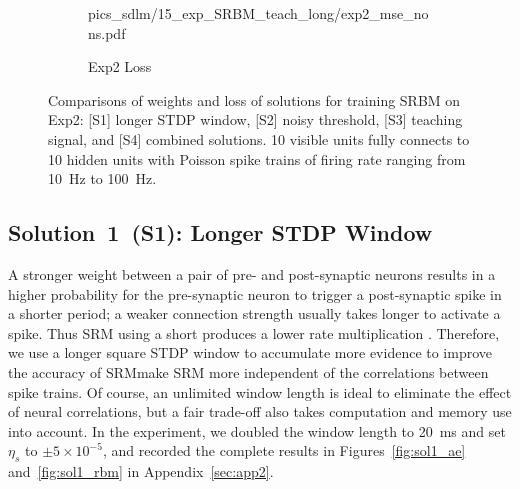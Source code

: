 \begin{figure}
\begin{subfigure}[c]{0.48\textwidth}
{			{pics_sdlm/15_exp_SRBM_teach_long/exp2_mse_nons.pdf}}\\
		\caption{Exp2 Loss}
	\end{subfigure}%
	\DIFdelbeginFL %
\DIFdelendFL \DIFaddbeginFL \caption[Comparisons of solutions in training SRBM.]{\DIFaddendFL Comparisons of weights and loss of solutions for training SRBM on Exp2: [S1] longer STDP window, [S2] noisy threshold, [S3] teaching signal, and [S4] combined solutions. 10 visible units fully connects to 10 hidden units with Poisson spike trains of firing rate ranging from 10~Hz to 100~Hz.}
	\label{fig:sols_rbm}
\end{figure}

\subsection{Solution~1~(S1): Longer STDP Window}
A stronger weight between a pair of pre- and post-synaptic neurons results in a higher probability for the pre-synaptic neuron to trigger a post-synaptic spike in a shorter period; 
a weaker connection strength usually takes longer to activate a spike.
Thus SRM using a short \DIFdelbegin {}\DIFdelend \DIFaddbegin {}\DIFaddend produces a lower rate multiplication \DIFdelbegin {}\DIFdelend \DIFaddbegin {}\DIFaddend .
Therefore, we use a longer square STDP window to accumulate more evidence to improve the accuracy of SRM\DIFdelbegin {}\DIFdelend \DIFaddbegin {}\DIFaddend make SRM more independent of the correlations between spike trains.
Of course, an unlimited window length is ideal to eliminate the effect of neural correlations, but a fair trade-off also takes computation and memory use into account.
In the experiment, we doubled the window length to 20~ms and set $\eta_s$ to $\pm 5 \times 10^{-5}$, and recorded the complete results in Figures~\ref{fig:sol1_ae} and~\ref{fig:sol1_rbm} in Appendix~\ref{sec:app2}.

